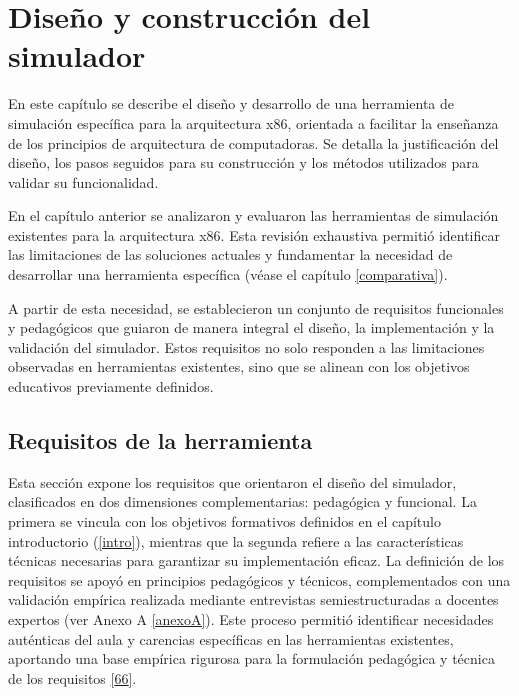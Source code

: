 \documentclass[12pt,oneside]{templates/unerthesis}
\begin{document}
\hypertarget{desarrollo}{%
\chapter{Diseño y construcción del simulador}\label{desarrollo}}

En este capítulo se describe el diseño y desarrollo de una herramienta de simulación específica para la arquitectura x86, orientada a facilitar la enseñanza de los principios de arquitectura de computadoras. Se detalla la justificación del diseño, los pasos seguidos para su construcción y los métodos utilizados para validar su funcionalidad.

En el capítulo anterior se analizaron y evaluaron las herramientas de simulación existentes para la arquitectura x86. Esta revisión exhaustiva permitió identificar las limitaciones de las soluciones actuales y fundamentar la necesidad de desarrollar una herramienta específica (véase el capítulo \ref{comparativa}).

A partir de esta necesidad, se establecieron un conjunto de requisitos funcionales y pedagógicos que guiaron de manera integral el diseño, la implementación y la validación del simulador. Estos requisitos no solo responden a las limitaciones observadas en herramientas existentes, sino que se alinean con los objetivos educativos previamente definidos.

\hypertarget{requisitos-de-la-herramienta}{%
\section{Requisitos de la herramienta}\label{requisitos-de-la-herramienta}}

Esta sección expone los requisitos que orientaron el diseño del simulador, clasificados en dos dimensiones complementarias: pedagógica y funcional. La primera se vincula con los objetivos formativos definidos en el capítulo introductorio (\ref{intro}), mientras que la segunda refiere a las características técnicas necesarias para garantizar su implementación eficaz. La definición de los requisitos se apoyó en principios pedagógicos y técnicos, complementados con una validación empírica realizada mediante entrevistas semiestructuradas a docentes expertos (ver Anexo A \ref{anexoA}). Este proceso permitió identificar necesidades auténticas del aula y carencias específicas en las herramientas existentes, aportando una base empírica rigurosa para la formulación pedagógica y técnica de los requisitos \protect\hyperlink{ref-huberman2019qualitative}{{[}66{]}}.
\end{document}
